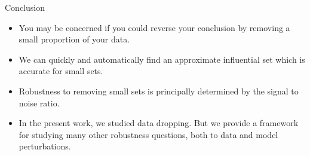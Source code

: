 \begin{frame}{Conclusion}

\begin{itemize}
\item You may be concerned if you could reverse your conclusion by removing
a small proportion of your data.

\pause \item We can quickly and automatically find an approximate influential
set which is accurate for small sets.

\pause \item Robustness to removing small sets is principally determined by the
signal to noise ratio.

\pause
\item In the present work, we studied data dropping.  But we
provide a framework for studying many other robustness
questions, both to data and model perturbations.


\end{itemize}

\end{frame}
